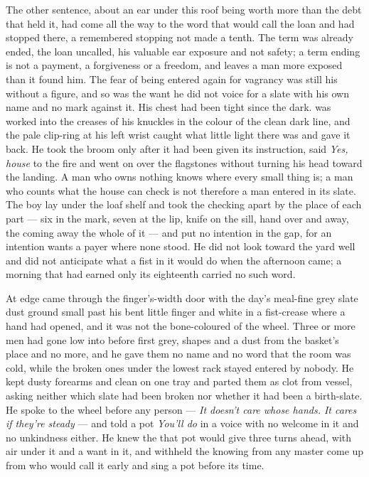 The other sentence, about an ear under this roof being worth more than the debt that held it, had come all the way to the word that would call the loan and had stopped there, a remembered stopping not made a tenth. The term was already ended, the loan uncalled, his valuable ear exposure and not safety; a term ending is not a payment, a forgiveness or a freedom, and leaves a man more exposed than it found him. The fear of being entered again for vagrancy was still his without a figure, and so was the want he did not voice for a slate with his own name and no mark against it. His chest had been tight since the dark.  was worked into the creases of his knuckles in the colour of the clean dark line, and the pale clip-ring at his left wrist caught what little light there was and gave it back. He took the broom only after it had been given its instruction, said \emph{Yes, house} to the fire and went on over the flagstones without turning his head toward the landing. A man who owns nothing knows where every small thing is; a man who counts what the house can check is not therefore a man entered in its slate. The boy lay under the loaf shelf and took the checking apart by the place of each part --- six in the mark, seven at the lip, knife on the sill, hand over and away, the coming away the whole of it --- and put no intention in the gap, for an intention wants a payer where none stood. He did not look toward the yard well and did not anticipate what a fist in it would do when the afternoon came; a morning that had earned only its eighteenth carried no such word.

\scenebreak

At  edge  came through the finger's-width door with the day's meal-fine grey slate dust ground small past his bent little finger and white in a fist-crease where a hand had opened, and it was not the bone-coloured  of the wheel. Three or more men had gone low into  before first grey, shapes and a dust from the basket's place and no more, and he gave them no name and no word that the room was cold, while the broken ones under the lowest rack stayed entered by nobody. He kept dusty forearms and clean on one tray and parted them as clot from vessel, asking neither which slate had been broken nor whether it had been a birth-slate. He spoke to the wheel before any person --- \emph{It doesn't care whose hands. It cares if they're steady} --- and told a pot \emph{You'll do} in a voice with no welcome in it and no unkindness either. He knew the  that pot would give three turns ahead, with air under it and a want in it, and withheld the knowing from any master come up from  who would call it early and sing a pot before its time.

